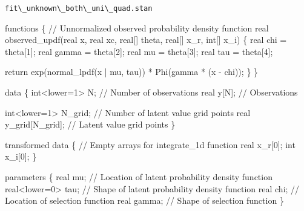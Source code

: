 \documentclass[
  letterpaper,
  DIV=11,
  numbers=noendperiod]{scrartcl}
\newenvironment{Shaded}{\begin{snugshade}}{\end{snugshade}}
\newcommand{\CommentTok}[1]{\textcolor[rgb]{0.37,0.37,0.37}{#1}}
\newcommand{\ControlFlowTok}[1]{\textcolor[rgb]{0.00,0.23,0.31}{#1}}
\newcommand{\DataTypeTok}[1]{\textcolor[rgb]{0.68,0.00,0.00}{#1}}
\newcommand{\DecValTok}[1]{\textcolor[rgb]{0.68,0.00,0.00}{#1}}
\newcommand{\KeywordTok}[1]{\textcolor[rgb]{0.00,0.23,0.31}{#1}}
\newcommand{\NormalTok}[1]{\textcolor[rgb]{0.00,0.23,0.31}{#1}}
\begin{document}
\begin{codelisting}

\caption{\texttt{fit\textbackslash\_unknown\textbackslash\_both\textbackslash\_uni\textbackslash\_quad.stan}}

\begin{Shaded}
\begin{Highlighting}[]
\KeywordTok{functions}\NormalTok{ \{}
  \CommentTok{// Unnormalized observed probability density function}
  \DataTypeTok{real}\NormalTok{ observed\_updf(}\DataTypeTok{real}\NormalTok{ x, }\DataTypeTok{real}\NormalTok{ xc, }\DataTypeTok{real}\NormalTok{[] theta, }\DataTypeTok{real}\NormalTok{[] x\_r, }\DataTypeTok{int}\NormalTok{[] x\_i) \{}
    \DataTypeTok{real}\NormalTok{ chi = theta[}\DecValTok{1}\NormalTok{];}
    \DataTypeTok{real}\NormalTok{ gamma = theta[}\DecValTok{2}\NormalTok{];}
    \DataTypeTok{real}\NormalTok{ mu = theta[}\DecValTok{3}\NormalTok{];}
    \DataTypeTok{real}\NormalTok{ tau = theta[}\DecValTok{4}\NormalTok{];}
    
    \ControlFlowTok{return}\NormalTok{ exp(normal\_lpdf(x | mu, tau)) * Phi(gamma * (x {-} chi));}
\NormalTok{  \}}
\NormalTok{\}}

\KeywordTok{data}\NormalTok{ \{}
  \DataTypeTok{int}\NormalTok{\textless{}}\KeywordTok{lower}\NormalTok{=}\DecValTok{1}\NormalTok{\textgreater{} N; }\CommentTok{// Number of observations}
  \DataTypeTok{real}\NormalTok{ y[N];      }\CommentTok{// Observations}

  \DataTypeTok{int}\NormalTok{\textless{}}\KeywordTok{lower}\NormalTok{=}\DecValTok{1}\NormalTok{\textgreater{} N\_grid; }\CommentTok{// Number of latent value grid points}
  \DataTypeTok{real}\NormalTok{ y\_grid[N\_grid]; }\CommentTok{// Latent value grid points}
\NormalTok{\}}

\KeywordTok{transformed data}\NormalTok{ \{}
  \CommentTok{// Empty arrays for \textasciigrave{}integrate\_1d\textasciigrave{} function}
  \DataTypeTok{real}\NormalTok{ x\_r[}\DecValTok{0}\NormalTok{];}
  \DataTypeTok{int}\NormalTok{ x\_i[}\DecValTok{0}\NormalTok{];}
\NormalTok{\}}

\KeywordTok{parameters}\NormalTok{ \{}
  \DataTypeTok{real}\NormalTok{ mu;           }\CommentTok{// Location of latent probability density function}
  \DataTypeTok{real}\NormalTok{\textless{}}\KeywordTok{lower}\NormalTok{=}\DecValTok{0}\NormalTok{\textgreater{} tau; }\CommentTok{// Shape of latent probability density function}
  \DataTypeTok{real}\NormalTok{ chi;   }\CommentTok{// Location of selection function}
  \DataTypeTok{real}\NormalTok{ gamma; }\CommentTok{// Shape of selection function}
\NormalTok{\}}


\end{Highlighting}
\end{Shaded}
\end{codelisting}
\end{document}
